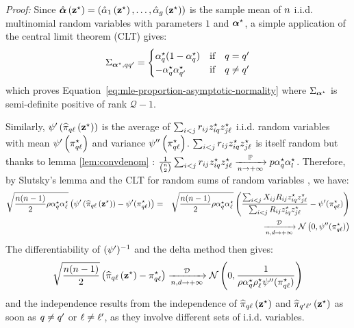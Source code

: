\documentclass[]{imsart}
\newcommand{\1}{\mathds{1}}
\numberwithin{equation}{section}
\theoremstyle{plain}
\theoremstyle{remark}
\begin{document}
\textit{Proof:}
Since $\hat{\boldsymbol{\alpha}}\left(\mathbf{z}^\star\right) = \left(\hat{\alpha}_1\left(\mathbf{z}^\star\right), \dots, \hat{\alpha}_g\left(\mathbf{z}^\star\right)\right)$ is the sample mean of $n$ i.i.d. multinomial random variables with parameters $1$ and $\boldsymbol{\alpha}^\star$, a simple application of the central limit theorem (CLT) gives:
\begin{equation*}
  \Sigma_{\bpis, \kk \kp} =
  \begin{cases}
    \pii^{\vrai}_{\kk}(1 - \pii^{\vrai}_{\kk}) & \text{if} \quad \kk = \kp \\
    -\pii^{\vrai}_{\kk} \pii^{\vrai}_{\kp} & \text{if} \quad \kk \neq \kp \\
  \end{cases}
\end{equation*}
which proves Equation~\eqref{eq:mle-proportion-asymptotic-normality}
where $\Sigma_{\boldsymbol{\alpha}^\star}$ is
semi-definite positive of rank $\mathcal{Q} - 1$.

Similarly, $\psi'\left(\widehat{\pi}_{q\ell}\left(\mathbf{z}^\star\right)\right)$ is
the average of $\sum_{i < j} r_{i j} z_{i q}^\star z_{j\ell}^\star$
i.i.d. random variables with mean
$\psi'\left(\pi^\star_{q\ell}\right)$ and variance
$\psi''\left(\pi^\star_{q\ell}\right)$. $\sum_{i < j} r_{i j} z_{i q}^\star z_{j\ell}^\star$
is itself random but thanks to lemma \ref{lem:convdenom} : 
\mbox{$\frac{1}{\binom{n}{2}}\sum_{i < j} r_{ij} z_{i q}^\star z_{j\ell}^\star \xrightarrow[n \to +\infty]{\mathbb{P}} p \alpha^\star_{q}\alpha^\star_{l}$}. Therefore, by Slutsky's lemma and
the CLT for random sums of random variables \cite{Shanthikumar1984}, we have:
\begin{eqnarray*}
\sqrt{\frac{\n(\n-1)}{2}\rho\pii^\star_{\kk}\pii^\star_{\el}} \left(\normp\left(\hal_{\kk\el}\left(\bzs\right)\right) - \normp(\al^\vrai_{\kk\el}) \right)  &=& \sqrt{\frac{\n(\n-1)}{2}\rho\pii^\star_{\kk}\pii^\star_{\el}} \left( \frac{\sum_{\ii < \jj} \Xij \Rij \zik^{\vrai} \zjl^{\vrai}}{\sum_{\ii < \jj} \Rij \ziq^\star \zjl^\star} - \normp(\al^\vrai_{\kk\el}) \right) \\
&& \xrightarrow[\n,\dd \to +\infty]{\mathcal{D}} \mcN\left(0, \normp'(\al^\vrai_{\kk\el})\right)
\end{eqnarray*}
The differentiability of $(\psi')^{-1}$ and the delta method then gives:
\begin{equation*}
  \sqrt{\frac{\n(\n-1)}{2}} \left(\hal_{\kk\el}\left(\bzs\right) - \al^\vrai_{\kk\el} \right) \xrightarrow[\n,\dd \to +\infty]{\mathcal{D}} \mcN\left(0, \frac{1}{\rho\pii^\star_{\kk}\rhoo^\star_{\el} \normp'(\al^\vrai_{\kk\el})}\right)
\end{equation*}
and the independence results from the independence of $\widehat{\pi}_{q\ell}\left(\mathbf{z}^\star\right)$ and
$\widehat{\pi}_{q'\ell'}\left(\mathbf{z}^\star\right)$ as soon as $q \neq q'$ or $\ell
\neq \ell'$, as they involve different sets of i.i.d. variables.
\end{document}
